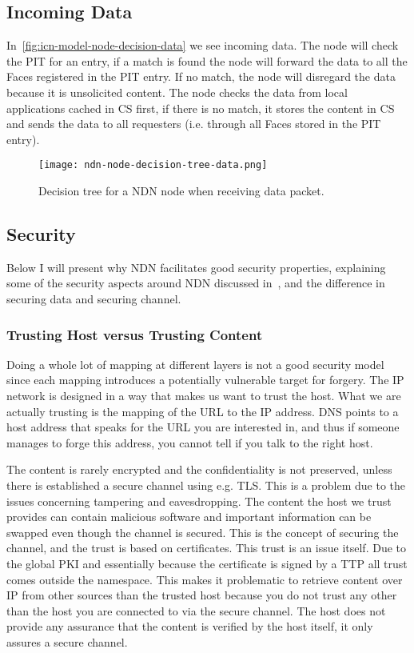 \subsection{Incoming Data}\label{incoming-data}
In~\autoref{fig:icn-model-node-decision-data} we see incoming \gls{data}.
The node will check  the \gls{PIT} for an entry, if a match is found the node will forward the \gls{data} to all the Faces registered in the \gls{PIT} entry.
If no match, the node will disregard the \gls{data} because it is unsolicited content.
The node checks the \gls{data} from local applications cached in \gls{CS} first, if there is no match, it stores the content in \gls{CS} and sends the \gls{data} to all requesters (i.e. through all Faces stored in the \gls{PIT} entry).
\begin{figure}[H]
  \centering
  \texttt{[image: ndn-node-decision-tree-data.png]}
  \caption{Decision tree for a NDN node when receiving \gls{data} packet.}
  \label{fig:icn-model-node-decision-data}
\end{figure}


\subsection{Security}\label{ndn-security}
Below I will present why \gls{NDN} facilitates good security properties, explaining some of the security aspects around \gls{NDN} discussed in~\cite{secure-network-content}, and the difference in securing data and securing channel.

\subsubsection{Trusting Host versus Trusting Content}
Doing a whole lot of mapping at different layers is not a good security model since each mapping introduces a potentially vulnerable target for forgery.
The \gls{IP} network is designed in a way that makes us want to trust the host.
What we are actually trusting is the mapping of the \gls{URL} to the \gls{IP} address.
\gls{DNS} points to a host address that speaks for the \gls{URL} you are interested in, and thus if someone manages to forge this address, you cannot tell if you talk to the right host.

The content is rarely encrypted and the confidentiality is not preserved, unless there is established a secure channel using e.g. \gls{TLS}.
This is a problem due to the issues concerning tampering and eavesdropping.
The content the host we trust provides can contain malicious software and important information can be swapped even though the channel is secured.
This is the concept of securing the channel, and the trust is based on certificates.
This trust is an issue itself. 
Due to the global \gls{PKI} and essentially because the certificate is signed by a \gls{TTP} all trust comes outside the namespace.
This makes it problematic to retrieve content over \gls{IP} from other sources than the trusted host because you do not trust any other than the host you are connected to via the secure channel.
The host does not provide any assurance that the content is verified by the host itself, it only assures a secure channel.

